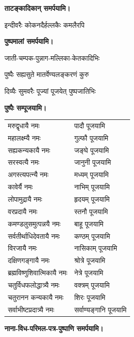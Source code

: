\begin{center}
\begin{center}
\textbf{\devAya{} ताटङ्कादिकान् समर्पयामि।}

{इन्दीवरैः कोकनदैर्हल्लकैः कमलैरपि}

\textbf{\devAya{} पुष्पमालां समर्पयामि।}

{जाती-चम्पक-पुन्नाग-मल्लिका-केतकादिभिः}

{पुष्पैः सह्यसुते मातर्वेण्यलङ्करणं कुरु}

{दिव्यैः सुमवरैः पूज्यां पूजयेत् पुष्पजातिभिः}

\textbf{\devAya{} पुष्पैः सम्पूजयामि।}


\begin{supertabular}{ll}
मरुद्वृधायै नमः & पादौ पूजयामि\\
महालक्ष्म्यै नमः & गुल्फौ पूजयामि\\
सह्यकन्यकायै नमः & जङ्घे पूजयामि\\
सरस्वत्यै नमः & जानुनी पूजयामि\\
अगस्त्यपत्न्यै नमः & मध्यम् पूजयामि\\
कावेर्यै नमः & नाभिम् पूजयामि\\
लोपामुद्रायै नमः & हृदयम् पूजयामि\\
वरप्रदायै नमः & स्तनौ पूजयामि\\
कमण्डलुसमुत्पन्नयै नमः & बाहू पूजयामि\\
सर्वतीर्थाधिदेवतायै नमः & कण्ठम् पूजयामि\\
विरजायै नमः & नासिकाम् पूजयामि\\
दक्षिणगङ्गायै नमः & श्रोत्रे पूजयामि\\
ब्रह्मविष्णुशिवात्मिकायै नमः & नेत्रे पूजयामि\\
चतुर्विधफलोद्धात्र्यै नमः & वक्त्रम् पूजयामि\\
चतुरानन कन्यकायै नमः & शिरः पूजयामि\\
सर्वाभीष्टप्रदात्र्यै नमः & सर्वाण्यङ्गानि पूजयामि\\
\end{supertabular}

\end{center}

\begingroup
\centering
\setlength{\columnseprule}{1pt}
\let\chapt\sect


\endgroup

\begin{center}
\textbf{\devAya{} नाना-विध-परिमल-पत्र-पुष्पाणि समर्पयामि।}


\end{center}
\end{center}

